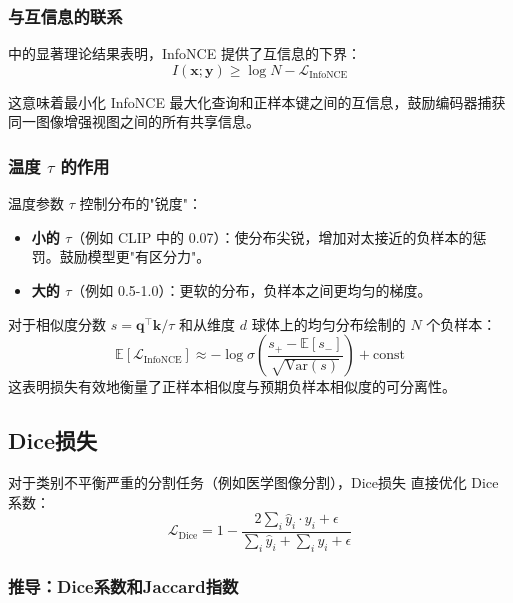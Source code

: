 \subsubsection{与互信息的联系}

\cite{oord2018representation} 中的显著理论结果表明，InfoNCE 提供了互信息的下界：
\begin{equation}
I(\mathbf{x}; \mathbf{y}) \geq \log N - \mathcal{L}_{\text{InfoNCE}}
\end{equation}

这意味着最小化 InfoNCE 最大化查询和正样本键之间的互信息，鼓励编码器捕获同一图像增强视图之间的所有共享信息。

\subsubsection{温度 \texorpdfstring{$\tau$}{tau} 的作用}

温度参数 $\tau$ 控制分布的"锐度"：
\begin{itemize}
    \item \textbf{小的 $\tau$}（例如 CLIP 中的 0.07）：使分布尖锐，增加对太接近的负样本的惩罚。鼓励模型更"有区分力"。
    \item \textbf{大的 $\tau$}（例如 0.5-1.0）：更软的分布，负样本之间更均匀的梯度。
\end{itemize}

对于相似度分数 $s = \mathbf{q}^\top \mathbf{k} / \tau$ 和从维度 $d$ 球体上的均匀分布绘制的 $N$ 个负样本：
\begin{equation}
\mathbb{E}[\mathcal{L}_{\text{InfoNCE}}] \approx -\log \sigma\!\left(\frac{s_{+} - \mathbb{E}[s_{-}]}{\sqrt{\text{Var}(s)}}\right) + \text{const}
\end{equation}
这表明损失有效地衡量了正样本相似度与预期负样本相似度的可分离性。

\subsection{Dice损失}

对于类别不平衡严重的分割任务（例如医学图像分割），Dice损失 \cite{milletari2016v} 直接优化 Dice 系数：
\begin{equation}
\mathcal{L}_{\text{Dice}} = 1 - \frac{2 \sum_{i} \hat{y}_i \cdot y_i + \epsilon}{\sum_{i} \hat{y}_i + \sum_{i} y_i + \epsilon}
\end{equation}

\subsubsection{推导：Dice系数和Jaccard指数}

